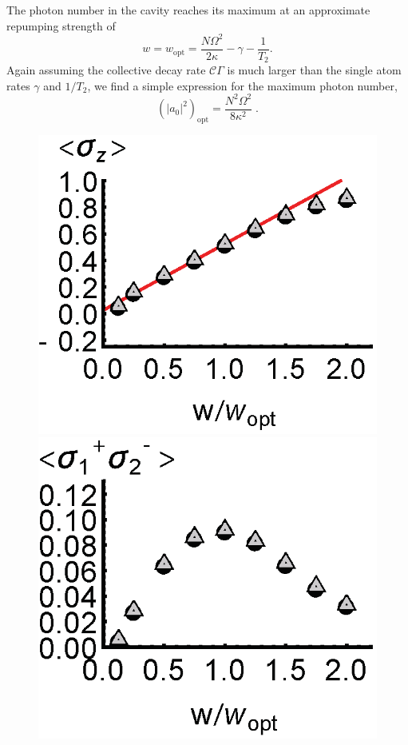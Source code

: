 \documentclass[aps,
twocolumn,
showpacs,
superscriptaddress,groupedaddress]{revtex4}
\begin{document}
The photon number in the cavity reaches its maximum at an approximate
repumping strength of
\begin{equation}
  w=w_{\mathrm{opt}}= \frac{N \Omega^2}{2\kappa} - \gamma - \frac{1}{T_2}.
\label{wopt}
\end{equation}
Again assuming the collective decay rate $\mathcal{C}\Gamma$ is much
larger than the single atom rates $\gamma$ and $1/T_2$, we find a
simple expression for the maximum photon number,
\begin{equation}
{(|a_0|^2)}_{\mathrm{opt}}= \frac{N^2 \Omega^2}{8\kappa^2}\;.
\label{adaopt}
\end{equation}

\begin{figure}
\begin{center}
	\includegraphics[scale =0.38] {N40SuperradianceSZ.eps}
	\hspace{-5.0mm} \includegraphics[scale =0.38] {N40SuperradianceSPSM.eps}

\end{center}
\end{figure}
\end{document}
